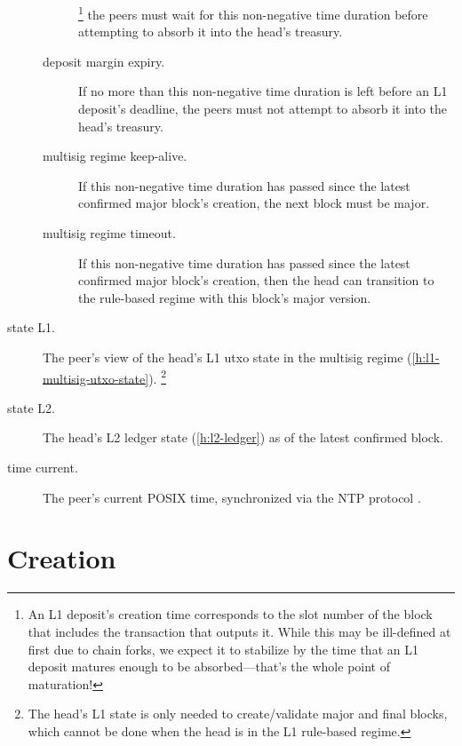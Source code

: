 \documentclass[../hydrozoa.tex]{subfiles}
\begin{document}
\begin{description}
\begin{description}
        \footnote{An L1 deposit's creation time corresponds to the slot number of the block that includes the transaction that outputs it.
          While this may be ill-defined at first due to chain forks, we expect it to stabilize by the time that an L1 deposit matures enough to be absorbed---that's the whole point of maturation!}
        the peers must wait for this non-negative time duration before attempting to absorb it into the head's treasury.
      \item[deposit margin expiry.] If no more than this non-negative time duration is left before an L1 deposit's deadline, the peers must not attempt to absorb it into the head's treasury.
      \item[multisig regime keep-alive.] If this non-negative time duration has passed since the latest confirmed major block's creation, the next block must be major.
      \item[multisig regime timeout.] If this non-negative time duration has passed since the latest confirmed major block's creation, then the head can transition to the rule-based regime with this block's major version.
    \end{description}
  \item[state L1.] The peer's view of the head's L1 utxo state in the multisig regime (\cref{h:l1-multisig-utxo-state}).%
    \footnote{The head's L1 state is only needed to create/validate major and final blocks, which cannot be done when the head is in the L1 rule-based regime.}
  \item[state L2.] The head's L2 ledger state (\cref{h:l2-ledger}) as of the latest confirmed block.
  \item[time current.] The peer's current POSIX time, synchronized via the NTP protocol \citep{MillsEtAlNetworkTimeProtocol2010}.
\end{description}

\section{Creation}%
\label{h:l2-block-creation}%
\end{document}
